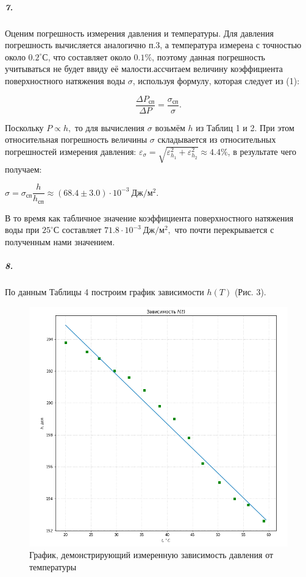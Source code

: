 \documentclass[a4paper,12pt]{article}
\begin{document}
\subparagraph*{7.} Оценим погрешность измерения давления и температуры. Для давления погрешность вычисляется аналогично п.3, а температура измерена с точностью около $0.2 ^\circ С$, что составляет около $0.1 \%$, поэтому данная погрешность учитываться не будет ввиду её малости.ассчитаем величину коэффициента поверхностного натяжения воды  $\sigma$, используя формулу, которая следует из (1): 

$$
\frac{\Delta P_{сп}}{\Delta P} = \frac{\sigma_{сп}}{\sigma} .
$$



Поскольку $P \propto h,$ то для вычисления $\sigma$ возьмём $h$ из Таблиц 1 и 2. При этом относительная погрешность величины $\sigma$  складывается из относительных погрешностей измерения давления: $\varepsilon_\sigma =\sqrt{\varepsilon_{h_1}^2 + \varepsilon_{h_2}^2} \approx 4.4 \%$, в результате чего получаем: 

$
\sigma = \sigma_{сп}\dfrac{h}{h_{сп}} \approx (68.4 \pm 3.0)\cdot 10^{-3} ~Дж /м^2.
$

 В то время как табличное значение коэффициента поверхностного натяжения воды при $25^\circ С$ составляет $71.8 \cdot 10^{-3} ~Дж /м^2, $ что почти перекрывается с полученным нами значением. 

\subparagraph*{8.}По данным Таблицы 4 построим график зависимости  $h(T)$ (Рис. 3).


\begin{figure} [h!]
	\centering 
	\includegraphics[scale=0.55]{2.jpg} 
	\caption{График, демонстрирующий измеренную зависимость давления от температуры} 
\end{figure}
\end{document}
